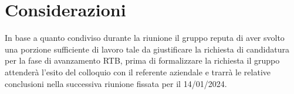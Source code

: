 \section{Considerazioni}
In base a quanto condiviso durante la riunione il gruppo reputa di aver svolto una porzione sufficiente di lavoro tale da giustificare la richiesta di candidatura per la fase di avanzamento RTB, prima di formalizzare la richiesta il gruppo attenderà l'esito del colloquio con il referente aziendale e trarrà le relative conclusioni nella successiva riunione fissata per il 14/01/2024.